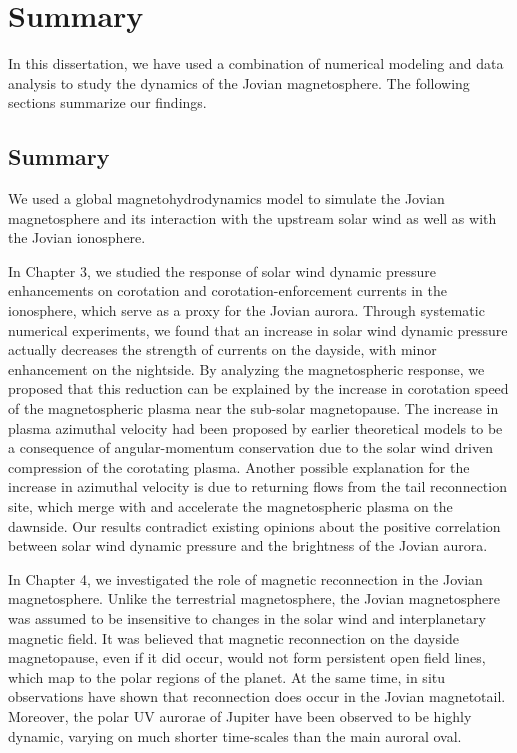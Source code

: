\chapter{Summary}

In this dissertation, we have used a combination of numerical modeling and  data analysis to study the dynamics of the Jovian magnetosphere. The following sections summarize our findings.

\section{Summary}
We used a global magnetohydrodynamics model to simulate the Jovian magnetosphere and its interaction with the upstream solar wind as well as with the Jovian ionosphere. 

In Chapter 3, we studied the response of solar wind dynamic pressure enhancements on corotation and corotation-enforcement currents in the ionosphere, which serve as a proxy for the Jovian aurora. Through systematic numerical experiments, we found that an increase in solar wind dynamic pressure actually decreases the strength of currents on the dayside, with minor enhancement on the nightside. By analyzing the magnetospheric response, we proposed that this reduction can be explained by the increase in corotation speed of the magnetospheric plasma near the sub-solar magnetopause. The increase in plasma azimuthal velocity had been proposed by earlier theoretical models to be a consequence of angular-momentum conservation due to the solar wind driven compression of the corotating plasma. Another possible explanation for the increase in azimuthal velocity is due to returning flows from the tail reconnection site, which merge with and accelerate the magnetospheric plasma on the dawnside. Our results contradict existing opinions about the positive correlation between solar wind dynamic pressure and the brightness of the Jovian aurora.

In Chapter 4, we investigated the role of magnetic reconnection in the Jovian magnetosphere. Unlike the terrestrial magnetosphere, the Jovian magnetosphere was assumed to be insensitive to changes in the solar wind and interplanetary magnetic field. It was believed that magnetic reconnection on the dayside magnetopause, even if it did occur, would not form persistent open field lines, which map to the polar regions of the planet. At the same time, in situ observations have shown that reconnection does occur in the Jovian magnetotail. Moreover, the polar UV aurorae of Jupiter have been observed to be highly dynamic, varying on much shorter time-scales than the main auroral oval.

